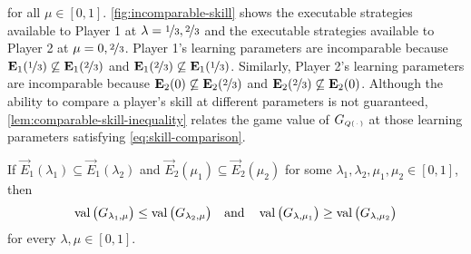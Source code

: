     for all $\mu \in [0, 1]$.
    \autoref{fig:incomparable-skill} shows the executable strategies available to Player 1 at $\lambda = \nicefrac{1}{3}, \nicefrac{2}{3}$ and the executable strategies available to Player 2 at $\mu = 0, \nicefrac{2}{3}$.
    Player 1's learning parameters are incomparable because $\vec{E}_1(\nicefrac{1}{3}) \not\subseteq \vec{E}_1(\nicefrac{2}{3})$ and $\vec{E}_1(\nicefrac{2}{3}) \not\subseteq \vec{E}_1(\nicefrac{1}{3})$.
    Similarly, Player 2's learning parameters are incomparable because $\vec{E}_2(0) \not\subseteq \vec{E}_2(\nicefrac{2}{3})$ and $\vec{E}_2(\nicefrac{2}{3}) \not\subseteq \vec{E}_2(0)$.
    Although the ability to compare a player's skill at different parameters is not guaranteed, \autoref{lem:comparable-skill-inequality} relates the game value of $G_\ms{Q(\funcdot)}$ at those learning parameters satisfying \eqref{eq:skill-comparison}.

    \begin{lemma} \label{lem:comparable-skill-inequality}
        If $\vec{E}_1(\lambda_1) \subseteq \vec{E}_1(\lambda_2)$ and $\vec{E}_2(\mu_1) \subseteq \vec{E}_2(\mu_2)$ for some $\lambda_1, \lambda_2, \mu_1, \mu_2 \in [0, 1]$, then
        \begin{equation} \label{eq:comparable-skill-inequality}
            \val\big(G_{\lambda_1, \mu}\big)
                \le \val\big(G_{\lambda_2, \mu}\big)
            \quad\text{and}\quad
            \val\big(G_{\lambda, \mu_1}\big)
                \ge \val\big(G_{\lambda, \mu_2}\big)
        \end{equation}
        for every $\lambda, \mu \in [0, 1]$.
    \end{lemma}

